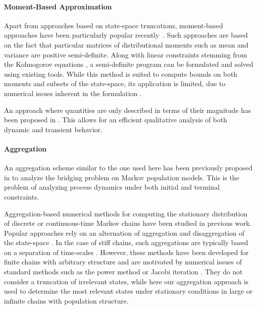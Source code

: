 \paragraph{Moment-Based Approximation}
Apart from approaches based on state-space truncations, moment-based approaches have been particularly popular recently~\cite{ghusinga2017exact,dowdy2018bounds,kuntz2017rigorous,sakurai2017convex}.
Such approaches are based on the fact that particular matrices of distributional moments such as mean and variance are positive semi-definite.
Along with linear constraints stemming from the Kolmogorov equations \cite{backenkohler2016generalized}, a semi-definite program can be formulated and solved using existing tools.
While this method is suited to compute bounds on both moments and subsets of the state-space, its application is limited, due to numerical issues inherent in the formulation \cite{dowdy2018bounds}.

An approach where quantities are only described in terms of their magnitude has been proposed in \citet{ceska2019semi}. This allows for an efficient qualitative analysis of both dynamic and transient behavior.

\paragraph{Aggregation}
An aggregation scheme similar to the one used here has been previously proposed in \citet{backenkohler2020analysis} to analyze the bridging problem on Markov population models.
This is the problem of analyzing process dynamics under both initial and terminal constraints.

Aggregation-based numerical methods for computing the stationary distribution 
of discrete or continuous-time Markov chains have been studied in
previous work. Popular approaches rely on an alternation of aggregation and 
disaggregation of the state-space \cite{stewart1994introduction,schweitzer1991survey}.
In the case of stiff chains, such aggregations are typically based on 
a separation of time-scales \cite{cao1985iterative}.
However, these methods have been developed for finite chains with arbitrary structure and are motivated by numerical issues of standard methods such as 
the power method or Jacobi iteration \cite{stewart1994introduction}.
They do not consider a truncation of irrelevant states, while
here our aggregation approach is used to determine the most relevant states
under stationary conditions in large or infinite chains with population structure.




